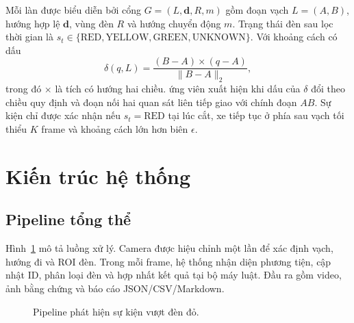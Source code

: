 \documentclass[11pt,a4paper]{article}
\begin{document}
Mỗi làn được biểu diễn bởi cổng $G=(L,\boldsymbol{d},R,m)$ gồm đoạn vạch $L=(A,B)$, hướng hợp lệ $\boldsymbol{d}$, vùng đèn $R$ và hướng chuyển động $m$. Trạng thái đèn sau lọc thời gian là $s_t\in\{\text{RED},\text{YELLOW},\text{GREEN},\text{UNKNOWN}\}$. Với khoảng cách có dấu
\begin{equation}
\delta(q,L)=\frac{(B-A)\times(q-A)}{\lVert B-A\rVert_2},
\end{equation}
trong đó $\times$ là tích có hướng hai chiều.
ứng viên xuất hiện khi dấu của $\delta$ đổi theo chiều quy định và đoạn nối hai quan sát liên tiếp giao với chính đoạn $AB$. Sự kiện chỉ được xác nhận nếu $s_t=\text{RED}$ tại lúc cắt, xe tiếp tục ở phía sau vạch tối thiểu $K$ frame và khoảng cách lớn hơn biên $\epsilon$.

\section{Kiến trúc hệ thống}
\subsection{Pipeline tổng thể}
Hình~\ref{fig:pipeline} mô tả luồng xử lý. Camera được hiệu chỉnh một lần để xác định vạch, hướng đi và ROI đèn. Trong mỗi frame, hệ thống nhận diện phương tiện, cập nhật ID, phân loại đèn và hợp nhất kết quả tại bộ máy luật. Đầu ra gồm video, ảnh bằng chứng và báo cáo JSON/CSV/Markdown.

\begin{figure}[t]
\centering
{}
\caption{Pipeline phát hiện sự kiện vượt đèn đỏ.}
\label{fig:pipeline}
\end{figure}
\end{document}
